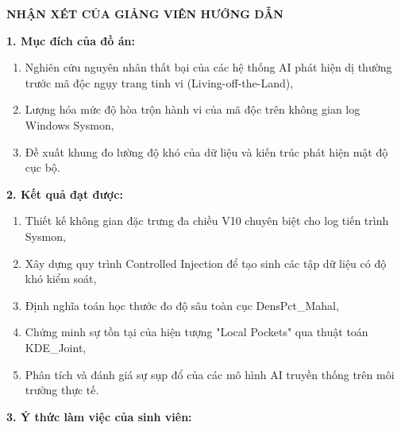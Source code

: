 ﻿\documentclass[../main.tex]{subfiles}
\begin{document}
\setcounter{page}{1}
\thisfancypage{
	\setlength{\fboxsep}{0.5cm}
	\fbox}{}

\fontsize{13pt}{16pt}\selectfont
\bigbreak
\begin{center}
	{\bf NHẬN XÉT CỦA GIẢNG VIÊN HƯỚNG DẪN}
\end{center}
\bigbreak
\vspace{1.5cm}
\hspace{-0.6cm}\textbf{1. Mục đích của đồ án:}
\begin{enumerate}[label=(\alph*)]
    \item Nghiên cứu nguyên nhân thất bại của các hệ thống AI phát hiện dị thường trước mã độc ngụy trang tinh vi (Living-off-the-Land),
    \item Lượng hóa mức độ hòa trộn hành vi của mã độc trên không gian log Windows Sysmon,
    \item Đề xuất khung đo lường độ khó của dữ liệu và kiến trúc phát hiện mật độ cục bộ.
\end{enumerate}
\textbf{2. Kết quả đạt được:}
\begin{enumerate}[label=(\alph*)]
    \item Thiết kế không gian đặc trưng đa chiều V10 chuyên biệt cho log tiến trình Sysmon,
    \item Xây dựng quy trình Controlled Injection để tạo sinh các tập dữ liệu có độ khó kiểm soát,
    \item Định nghĩa toán học thước đo độ sâu toàn cục DensPct\_Mahal,
    \item Chứng minh sự tồn tại của hiện tượng "Local Pockets" qua thuật toán KDE\_Joint,
    \item Phân tích và đánh giá sự sụp đổ của các mô hình AI truyền thống trên môi trường thực tế.
\end{enumerate}
\textbf{3. Ý thức làm việc của sinh viên:}
\\\\\\\
\end{document}
